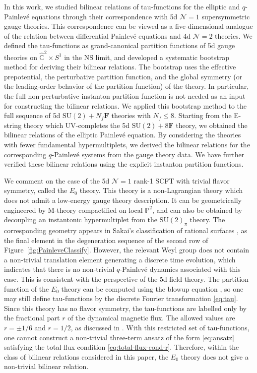 \documentclass[11pt, a4paper]{article}
\theoremstyle{definition}
\begin{document}
In this work, we studied bilinear relations of tau-functions for the elliptic and $ q $-Painlev\'e equations through their correspondence with 5d $ \mathcal{N}=1 $ supersymmetric gauge theories. This correspondence can be viewed as a five-dimensional analogue of the relation between differential Painlev\'e equations and 4d $ \mathcal{N}=2 $ theories. We defined the tau-functions as grand-canonical partition functions of 5d gauge theories on $ \hat{\mathbb{C}}^2 \times S^1 $ in the NS limit, and developed a systematic bootstrap method for deriving their bilinear relations. The bootstrap uses the effective prepotential, the perturbative partition function, and the global symmetry (or the leading-order behavior of the partition function) of the theory. In particular, the full non-perturbative instanton partition function is not needed as an input for constructing the bilinear relations. We applied this bootstrap method to the full sequence of 5d $ \mathrm{SU}(2)+N_f\mathbf{F} $ theories with $ N_f \leq 8 $. Starting from the E-string theory which UV-completes the 5d $ \mathrm{SU}(2)+8\mathbf{F} $ theory, we obtained the bilinear relations of the elliptic Painlev\'e equation. By considering the theories with fewer fundamental hypermultiplets, we derived the bilinear relations for the corresponding $ q $-Painlev\'e systems from the gauge theory data. We have further verified these bilinear relations using the explicit instanton partition functions.

We comment on the case of the 5d $ \mathcal{N}=1 $ rank-1 SCFT with trivial flavor symmetry, called the $ E_0 $ theory. This theory is a non-Lagrangian theory which does not admit a low-energy gauge theory description. It can be geometrically engineered by M-theory compactified on local $ \mathbb{P}^2 $, and can also be obtained by decoupling an instantonic hypermultiplet from the $ \mathrm{SU}(2)_\pi $ theory. The corresponding geometry appears in Sakai's classification of rational surfaces \cite{Sakai:2001}, as the final element in the degeneration sequence of the second row of Figure~\ref{fig:PainleveClassify}. However, the relevant Weyl group does not contain a non-trivial translation element generating a discrete time evolution, which indicates that there is no non-trivial $ q $-Painlev\'e dynamics associated with this case. This is consistent with the perspective of the 5d field theory. The partition function of the $ E_0 $ theory can be computed using the blowup equation \cite{Kim:2020hhh, Huang:2017mis}, so one may still define tau-functions by the discrete Fourier transformation \eqref{eq:tau}. Since this theory has no flavor symmetry, the tau-functions are labelled only by the fractional part $ r $ of the dynamical magnetic flux. The allowed values are $ r=\pm 1/6 $ and $ r=1/2 $, as discussed in \cite{Kim:2020hhh}. With this restricted set of tau-functions, one cannot construct a non-trivial three-term ansatz of the form \eqref{eq:ansatz} satisfying the total flux condition \eqref{eq:total-flux-cond-r}. Therefore, within the class of bilinear relations considered in this paper, the $ E_0 $ theory does not give a non-trivial bilinear relation.
\end{document}
